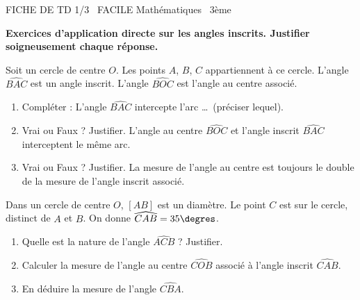 \documentclass[11pt]{article}
\begin{document}
\begin{tcolorbox}[enhanced,colback=popink,colframe=popink,arc=10pt,boxrule=0pt,left=12pt,right=12pt,top=9pt,bottom=9pt]
{\color{white}\popxbold\small FICHE DE TD 1/3 \textbullet\ FACILE \hfill Mathématiques \textbullet\ 3ème\par}
\end{tcolorbox}
\vspace{4pt}
\noindent \textbf{Exercices d'application directe sur les angles inscrits. Justifier soigneusement chaque réponse.}

\begin{exercice}
Soit un cercle de centre $O$. Les points $A$, $B$, $C$ appartiennent à ce cercle. L'angle $\widehat{BAC}$ est un angle inscrit. L'angle $\widehat{BOC}$ est l'angle au centre associé.
\begin{enumerate}
    \item Compléter : L'angle $\widehat{BAC}$ intercepte l'arc \ldots\ (préciser lequel).
    \item Vrai ou Faux ? Justifier. \og L'angle au centre $\widehat{BOC}$ et l'angle inscrit $\widehat{BAC}$ interceptent le même arc.\fg
    \item Vrai ou Faux ? Justifier. \og La mesure de l'angle au centre est toujours le double de la mesure de l'angle inscrit associé.\fg
\end{enumerate}
\end{exercice}

\begin{exercice}
Dans un cercle de centre $O$, $[AB]$ est un diamètre. Le point $C$ est sur le cercle, distinct de $A$ et $B$. On donne $\widehat{CAB} = 35\degres$.
\begin{enumerate}
    \item Quelle est la nature de l'angle $\widehat{ACB}$ ? Justifier.
    \item Calculer la mesure de l'angle au centre $\widehat{COB}$ associé à l'angle inscrit $\widehat{CAB}$.
    \item En déduire la mesure de l'angle $\widehat{CBA}$.
\end{enumerate}
\end{exercice}
\end{document}
